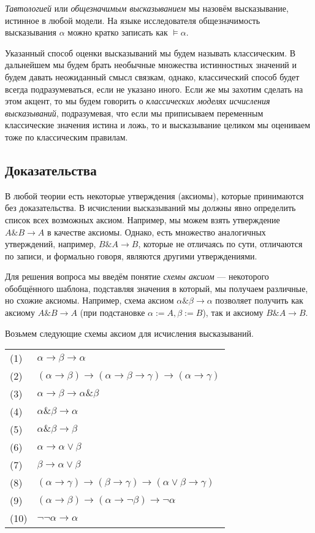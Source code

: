\emph{Тавтологией} или 
\emph{общезначимым высказыванием} мы назовём высказывание, истинное в любой модели.
На языке исследователя общезначимость высказывания $\alpha$ можно кратко 
записать как $\models \alpha$. 

Указанный способ оценки высказываний мы будем называть классическим.
В дальнейшем мы будем брать необычные множества истинностных значений и будем давать
неожиданный смысл связкам, однако, классический способ будет всегда подразумеваться, 
если не указано иного. Если же мы захотим сделать на этом акцент, то мы будем говорить
о \emph{классических моделях исчисления высказываний}, подразумевая, что
если мы приписываем переменным классические значения истина и ложь, 
то и высказывание целиком мы оцениваем тоже по классическим правилам.

\subsection{Доказательства}

В любой теории есть некоторые утверждения (аксиомы), которые принимаются без доказательства.
В исчислении высказываний мы должны явно определить список всех возможных аксиом. 
Например, мы можем взять утверждение $A \& B \rightarrow A$ в качестве аксиомы.
Однако, есть множество аналогичных утверждений, например, $B \& A \rightarrow B$,
которые не отличаясь по сути, отличаются по записи, и формально говоря, являются другими
утверждениями.

Для решения вопроса мы введём понятие \emph{схемы аксиом} --- некоторого обобщённого
шаблона, подставляя значения в который, мы получаем различные, но схожие аксиомы. 
Например, схема аксиом $\alpha \& \beta \rightarrow \alpha$ позволяет получить как
аксиому $A \& B \rightarrow A$ (при подстановке $\alpha := A, \beta := B$), так и
аксиому $B \& A \rightarrow B$.

Возьмем следующие схемы аксиом для исчисления высказываний.

\begin{tabular}{ll}
(1) & $\alpha \rightarrow \beta \rightarrow \alpha$ \\
(2) & $(\alpha \rightarrow \beta) \rightarrow (\alpha \rightarrow \beta \rightarrow \gamma) \rightarrow (\alpha \rightarrow \gamma)$ \\
(3) & $\alpha \rightarrow \beta \rightarrow \alpha \& \beta$\\
(4) & $\alpha \& \beta \rightarrow \alpha$\\
(5) & $\alpha \& \beta \rightarrow \beta$\\
(6) & $\alpha \rightarrow \alpha \vee \beta$\\
(7) & $\beta \rightarrow \alpha \vee \beta$\\
(8) & $(\alpha \rightarrow \gamma) \rightarrow (\beta \rightarrow \gamma) \rightarrow (\alpha \vee \beta \rightarrow \gamma)$\\
(9) & $(\alpha \rightarrow \beta) \rightarrow (\alpha \rightarrow \neg \beta) \rightarrow \neg \alpha$\\
(10) & $\neg \neg \alpha \rightarrow \alpha$
\end{tabular}

